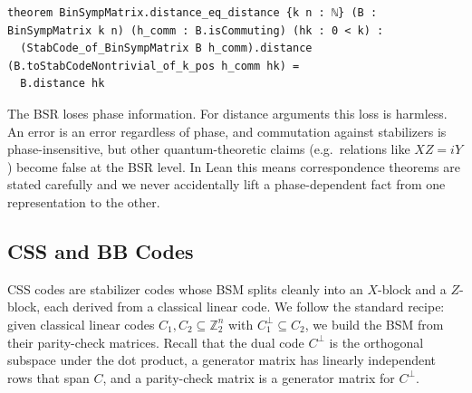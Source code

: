 \begin{lstlisting}
theorem BinSympMatrix.distance_eq_distance {k n : ℕ} (B : BinSympMatrix k n) (h_comm : B.isCommuting) (hk : 0 < k) :
  (StabCode_of_BinSympMatrix B h_comm).distance (B.toStabCodeNontrivial_of_k_pos h_comm hk) =
  B.distance hk
\end{lstlisting}

%

The BSR loses phase information. For distance arguments this loss is harmless. An error is an error regardless of phase, and commutation against
stabilizers is phase-insensitive, but other quantum-theoretic claims (e.g.\
relations like $XZ = iY$) become false at the BSR level. In Lean this means
correspondence theorems are stated carefully and we never accidentally lift a
phase-dependent fact from one representation to the other.

\subsection{CSS and BB Codes}\label{sec:cssbb}

%

CSS codes are stabilizer codes whose BSM splits cleanly into an $X$-block and a
$Z$-block, each derived from a classical linear code. We follow the standard
recipe: given classical linear codes $C_1, C_2 \subseteq \mathbb{Z}_2^n$ with
$C_1^\perp \subseteq C_2$, we build the BSM from their parity-check matrices.
Recall that the dual code $C^\perp$ is the orthogonal subspace under the dot
product, a generator matrix has linearly independent rows that span $C$, and a
parity-check matrix is a generator matrix for $C^\perp$.


